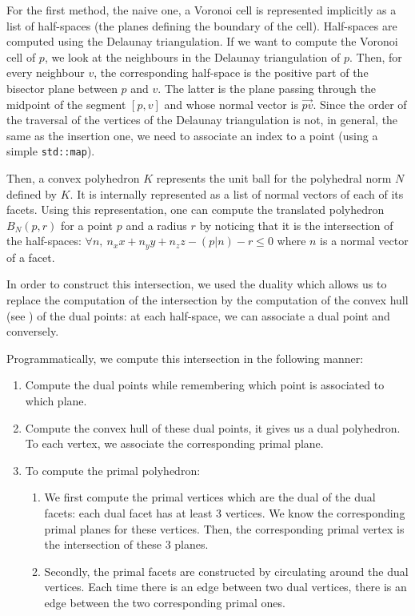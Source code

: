 For the first method, the naive one, a Voronoi cell is represented implicitly as
a list of half-spaces (the planes defining the boundary of the cell).
Half-spaces are computed using the Delaunay triangulation. If we want to compute
the Voronoi cell of $ p $, we look at the neighbours in the Delaunay
triangulation of $ p $. Then, for every neighbour $ v $, the corresponding
half-space is the positive part of the bisector plane between $ p $ and $ v $.
The latter is the  plane passing through the midpoint of the segment $ [p, v] $
and whose normal vector is $ \vec{pv} $. Since the order of the traversal of the
vertices of the Delaunay triangulation is not, in general, the same as the
insertion one, we need to associate an index to a point (using a simple
\texttt{std::map}).

Then, a convex polyhedron $ K $ represents the unit ball for the polyhedral norm
$ N $ defined by $ K $. It is internally represented as a list of normal vectors
of each of its facets. Using this representation, one can compute the translated
polyhedron $ B_N(p, r) $ for a point $ p $ and a radius $ r $ by noticing that
it is the intersection of the half-spaces: $ \forall n,~ n_x x + n_y y + n_z z -
(p | n) - r \leq 0 $ where $ n $ is a normal vector of a facet.

In order to construct this intersection, we used the duality which allows us to
replace the computation of the intersection by the computation of the convex
hull (see \cite{preparata1979finding}) of the dual points: at each half-space, we
can associate a dual point and conversely.

Programmatically, we compute this intersection in the following manner:
\begin{enumerate}
    \item Compute the dual points while remembering which point is associated to
        which plane.
    \item Compute the convex hull of these dual points, it gives us a dual
        polyhedron. To each vertex, we associate the corresponding primal plane.
    \item To compute the primal polyhedron:
        \begin{enumerate}
            \item We first compute the primal vertices which are the dual of the
                dual facets: each dual facet has at least 3 vertices. We know
                the corresponding primal planes for these vertices.  Then, the
                corresponding primal vertex is the intersection of these 3
                planes.
            \item Secondly, the primal facets are constructed by circulating
                around the dual vertices. Each time there is an edge between two
                dual vertices, there is an edge between the two corresponding
                primal ones.
        \end{enumerate}
\end{enumerate}

